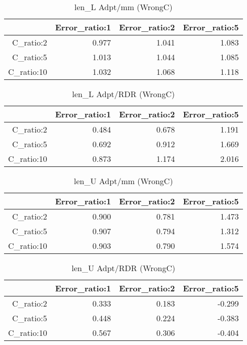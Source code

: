 \begin{table}[ht]
\centering
\begin{tabular}{rrrr}
  \hline
 & Error\_ratio:1 & Error\_ratio:2 & Error\_ratio:5 \\ 
  \hline
C\_ratio:2 & 0.977 & 1.041 & 1.083 \\ 
  C\_ratio:5 & 1.013 & 1.044 & 1.085 \\ 
  C\_ratio:10 & 1.032 & 1.068 & 1.118 \\ 
   \hline
\end{tabular}
\caption{len_L Adpt/mm (WrongC)} 
\end{table}
\begin{table}[ht]
\centering
\begin{tabular}{rrrr}
  \hline
 & Error\_ratio:1 & Error\_ratio:2 & Error\_ratio:5 \\ 
  \hline
C\_ratio:2 & 0.484 & 0.678 & 1.191 \\ 
  C\_ratio:5 & 0.692 & 0.912 & 1.669 \\ 
  C\_ratio:10 & 0.873 & 1.174 & 2.016 \\ 
   \hline
\end{tabular}
\caption{len_L Adpt/RDR (WrongC)} 
\end{table}
\begin{table}[ht]
\centering
\begin{tabular}{rrrr}
  \hline
 & Error\_ratio:1 & Error\_ratio:2 & Error\_ratio:5 \\ 
  \hline
C\_ratio:2 & 0.900 & 0.781 & 1.473 \\ 
  C\_ratio:5 & 0.907 & 0.794 & 1.312 \\ 
  C\_ratio:10 & 0.903 & 0.790 & 1.574 \\ 
   \hline
\end{tabular}
\caption{len_U Adpt/mm (WrongC)} 
\end{table}
\begin{table}[ht]
\centering
\begin{tabular}{rrrr}
  \hline
 & Error\_ratio:1 & Error\_ratio:2 & Error\_ratio:5 \\ 
  \hline
C\_ratio:2 & 0.333 & 0.183 & -0.299 \\ 
  C\_ratio:5 & 0.448 & 0.224 & -0.383 \\ 
  C\_ratio:10 & 0.567 & 0.306 & -0.404 \\ 
   \hline
\end{tabular}
\caption{len_U Adpt/RDR (WrongC)} 
\end{table}
